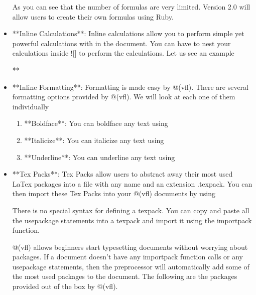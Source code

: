 \documentclass{article}
\begin{document}
\begin{itemize}
As you can see that the number of formulas are very limited. Version 2.0 will allow users to create their own formulas using Ruby. 

\item **Inline Calculations**: Inline calculations allow you to perform simple yet powerful calculations with in the document. You can have to nest your calculations inside ![] to perform the calculations. Let us see an example \vspace{5pt}

**%

\item **Inline Formatting**: Formatting is made easy by @(vfl). There are several formatting options provided by @(vfl). We will look at each one of them individually

\begin{enumerate}

\item **Boldface**: You can boldface any text using %

\item **Italicize**: You can italicize any text using %

\item **Underline**: You can underline any text using %

\end{enumerate}

\item **Tex Packs**:  Tex Packs allow users to abstract away their most used LaTex packages into a file with any name and an extension .texpack. You can then import these Tex Packs into your @(vfl) documents by using %

There is no special syntax for defining a texpack. You can copy and paste all the usepackage statements into a texpack and import it using the importpack function. 

@(vfl) allows beginners start typesetting documents without worrying about packages. If a document doesn't have any importpack function calls or any usepackage statements, then the preprocessor will automatically add some of the most used packages to the document. The following are the packages provided out of the box by @(vfl).


\end{itemize}
\end{document}
